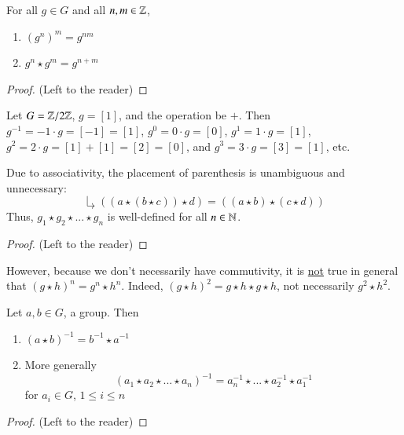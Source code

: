 \documentclass[12pt, a4paper, oneside, openright, titlepage]{book}
\begin{document}
\begin{prop}
    For all $g \in G$ and all $n,m \in \mathbb Z$, \begin{enumerate}
        \item $(g^n)^m = g^{nm}$
        \item $g^n\star g^m = g^{n+m}$
    \end{enumerate}
    \begin{proof}
        (Left to the reader)
    \end{proof}
\end{prop}

\begin{eg}
    Let $G = \mathbb Z/2\mathbb Z$, $g = [1]$, and the operation be $+$. Then $g^{-1} = -1\cdot g = [-1] = [1]$, $g^0 = 0\cdot g = [0]$, $g^1 = 1\cdot g = [1]$, $g^2 = 2\cdot g = [1]+[1] = [2] = [0]$, and $g^3 = 3\cdot g = [3] = [1]$, etc.
\end{eg}

\begin{rmk}
    Due to associativity, the placement of parenthesis is unambiguous and unnecessary:
    $$\drsh ((a\star (b\star c)) \star d) = ((a \star b) \star (c \star d))$$
    Thus, $g_1\star g_2 \star ... \star g_n$ is well-defined for all $n \in \mathbb N$. 
    \begin{proof}
        (Left to the reader)
    \end{proof}
\end{rmk}

\begin{note}
    However, because we don't necessarily have commutivity, it is \underline{not} true in general that $(g\star h)^n = g^n \star h^n$. Indeed, $(g\star h )^2 = g\star h \star g \star h$, not necessarily $g^2\star h^2$.
\end{note}

\begin{rmk}
    Let $a,b \in G$, a group. Then \begin{enumerate}
        \item $(a \star b)^{-1} = b^{-1}\star a^{-1}$
        \item More generally \begin{equation}
            (a_1\star a_2 \star ... \star a_n)^{-1} = a_n^{-1}\star ... \star a_2^{-1} \star a_1^{-1}
        \end{equation}
        for $a_i \in G$, $1 \leq i \leq n$
    \end{enumerate}
    \begin{proof}
        (Left to the reader)
    \end{proof}
\end{rmk}
\end{document}
